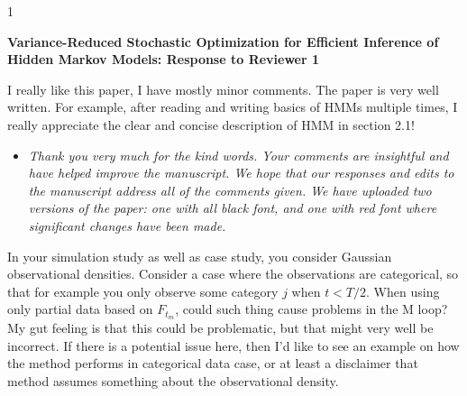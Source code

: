 \documentclass[11pt]{article}
\newcommand{\blind}{1}
\begin{document}
\blind
{
  \bigskip
  \bigskip
  \bigskip
  \begin{center}
    {\LARGE\bf Variance-Reduced Stochastic Optimization for Efficient Inference of Hidden Markov Models: Response to Reviewer 1}
  \end{center}
  \medskip
} \fi

I really like this paper, I have mostly minor comments. The paper is very well written. For example, after reading and writing basics of HMMs multiple times, I really appreciate the clear and concise description of HMM in section 2.1!

\begin{itemize}
    \item \textit{Thank you very much for the kind words. Your comments are insightful and have helped improve the manuscript. We hope that our responses and edits to the manuscript address all of the comments given. We have uploaded two versions of the paper: one with all black font, and one with red font where significant changes have been made.}
\end{itemize}

In your simulation study as well as case study, you consider Gaussian observational densities. Consider a case where the observations are categorical, so that for example you only observe some category $j$ when $t < T/2$. When using only partial data based on $F_{t_m}$, could such thing cause problems in the M loop? My gut feeling is that this could be problematic, but that might very well be incorrect. If there is a potential issue here, then I'd like to see an example on how the method performs in categorical data case, or at least a disclaimer that method assumes something about the observational density.
\end{document}
